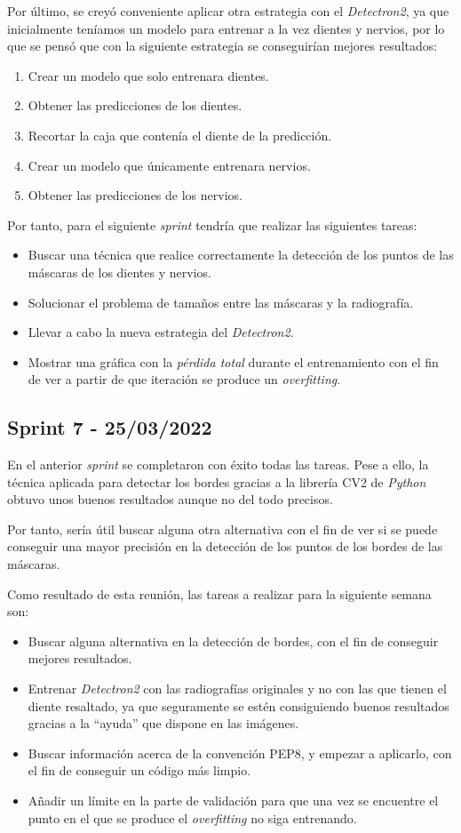 Por último, se creyó conveniente aplicar otra estrategia con el \emph{Detectron2}, ya que inicialmente teníamos un modelo para entrenar a la vez dientes y nervios, por lo que se pensó que con la siguiente estrategia se conseguirían mejores resultados:
\begin{enumerate}
    \item Crear un modelo que solo entrenara dientes.
    \item Obtener las predicciones de los dientes.
    \item Recortar la caja que contenía el diente de la predicción.
    \item Crear un modelo que únicamente entrenara nervios.
    \item Obtener las predicciones de los nervios.
\end{enumerate}
Por tanto, para el siguiente \emph{sprint} tendría que realizar las siguientes tareas:
\begin{itemize}
    \item Buscar una técnica que realice correctamente la detección de los puntos de las máscaras de los dientes y nervios.
    \item Solucionar el problema de tamaños entre las máscaras y la radiografía.
    \item Llevar a cabo la nueva estrategia del \emph{Detectron2}.
    \item Mostrar una gráfica con la \emph{pérdida total} durante el entrenamiento con el fin de ver a partir de que iteración se produce un \emph{overfitting}.
\end{itemize}

\subsection{Sprint 7 - 25/03/2022}
En el anterior \emph{sprint} se completaron con éxito todas las tareas. Pese a ello, la técnica aplicada para detectar los bordes gracias a la librería CV2 de \emph{Python} obtuvo unos buenos resultados aunque no del todo precisos.

Por tanto, sería útil buscar alguna otra alternativa con el fin de ver si se puede conseguir una mayor precisión en la detección de los puntos de los bordes de las máscaras.

Como resultado de esta reunión, las tareas a realizar para la siguiente semana son:
\begin{itemize}
    \item Buscar alguna alternativa en la detección de bordes, con el fin de conseguir mejores resultados.
    \item Entrenar \emph{Detectron2} con las radiografías originales y no con las que tienen el diente resaltado, ya que seguramente se estén consiguiendo buenos resultados gracias a la ``ayuda'' que dispone en las imágenes.
    \item Buscar información acerca de la convención PEP8, y empezar a aplicarlo, con el fin de conseguir un código más limpio.
    \item Añadir un límite en la parte de validación para que una vez se encuentre el punto en el que se produce el \emph{overfitting} no siga entrenando.  
\end{itemize}

